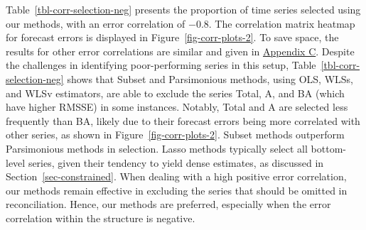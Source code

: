 \documentclass[
  11pt]{article}
\theoremstyle{plain}
\theoremstyle{remark}
\begin{document}
Table~\ref{tbl-corr-selection-neg} presents the proportion of time
series selected using our methods, with an error correlation of
\(-0.8\). The correlation matrix heatmap for forecast errors is
displayed in Figure~\ref{fig-corr-plots-2}. To save space, the results
for other error correlations are similar and given in
\hyperref[appendix-sim2]{Appendix C}. Despite the challenges in
identifying poor-performing series in this setup,
Table~\ref{tbl-corr-selection-neg} shows that Subset and Parsimonious
methods, using OLS, WLSs, and WLSv estimators, are able to exclude the
series Total, A, and BA (which have higher RMSSE) in some instances.
Notably, Total and A are selected less frequently than BA, likely due to
their forecast errors being more correlated with other series, as shown
in Figure~\ref{fig-corr-plots-2}. Subset methods outperform Parsimonious
methods in selection. Lasso methods typically select all bottom-level
series, given their tendency to yield dense estimates, as discussed in
Section~\ref{sec-constrained}. When dealing with a high positive error
correlation, our methods remain effective in excluding the series that
should be omitted in reconciliation. Hence, our methods are preferred,
especially when the error correlation within the structure is negative.
\end{document}
